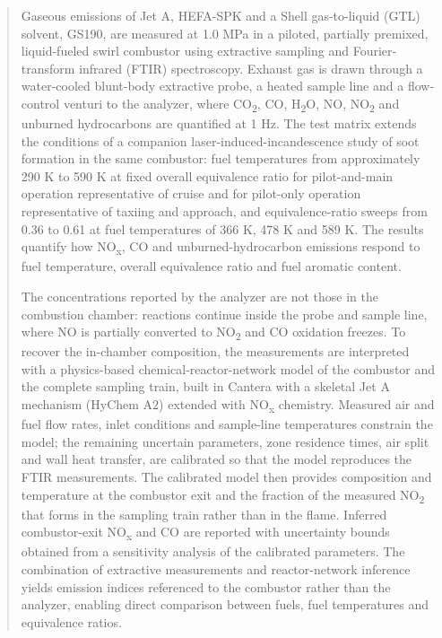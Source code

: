 \documentclass[balance,colorlinks]{asmeconf}
\begin{document}
\begin{abstract}
Gaseous emissions of Jet A, HEFA-SPK and a Shell gas-to-liquid (GTL) solvent, GS190, are measured at 1.0 MPa in a piloted, partially premixed, liquid-fueled swirl combustor using extractive sampling and Fourier-transform infrared (FTIR) spectroscopy. Exhaust gas is drawn through a water-cooled blunt-body extractive probe, a heated sample line and a flow-control venturi to the analyzer, where CO\textsubscript{2}, CO, H\textsubscript{2}O, NO, NO\textsubscript{2} and unburned hydrocarbons are quantified at 1 Hz. The test matrix extends the conditions of a companion laser-induced-incandescence study of soot formation in the same combustor: fuel temperatures from approximately 290 K to 590 K at fixed overall equivalence ratio for pilot-and-main operation representative of cruise and for pilot-only operation representative of taxiing and approach, and equivalence-ratio sweeps from 0.36 to 0.61 at fuel temperatures of 366 K, 478 K and 589 K. The results quantify how NO\textsubscript{x}, CO and unburned-hydrocarbon emissions respond to fuel temperature, overall equivalence ratio and fuel aromatic content.

The concentrations reported by the analyzer are not those in the combustion chamber: reactions continue inside the probe and sample line, where NO is partially converted to NO\textsubscript{2} and CO oxidation freezes. To recover the in-chamber composition, the measurements are interpreted with a physics-based chemical-reactor-network model of the combustor and the complete sampling train, built in Cantera with a skeletal Jet A mechanism (HyChem A2) extended with NO\textsubscript{x} chemistry. Measured air and fuel flow rates, inlet conditions and sample-line temperatures constrain the model; the remaining uncertain parameters, zone residence times, air split and wall heat transfer, are calibrated so that the model reproduces the FTIR measurements. The calibrated model then provides composition and temperature at the combustor exit and the fraction of the measured NO\textsubscript{2} that forms in the sampling train rather than in the flame. Inferred combustor-exit NO\textsubscript{x} and CO are reported with uncertainty bounds obtained from a sensitivity analysis of the calibrated parameters. The combination of extractive measurements and reactor-network inference yields emission indices referenced to the combustor rather than the analyzer, enabling direct comparison between fuels, fuel temperatures and equivalence ratios.
\end{abstract}
\end{document}
